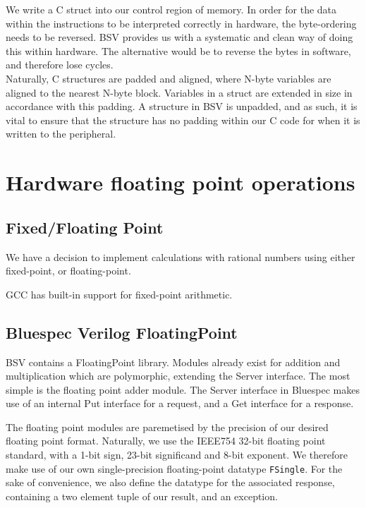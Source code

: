 \documentclass[a4paper,8pt]{report}
\begin{document}
We write a C struct into our control region of memory. In order for the data
within the instructions to be interpreted correctly in hardware, the
byte-ordering needs to be reversed. BSV provides us with a systematic and clean
way of doing this within hardware. The alternative would be to reverse the bytes
in software, and therefore lose cycles. \\


Naturally, C structures are padded and aligned, where N-byte variables are
aligned to the nearest N-byte block. Variables in a struct are extended in size
in accordance with this padding. A structure in BSV is unpadded, and as such, it
is vital to ensure that the structure has no padding within our C code for when
it is written to the peripheral.

\section{Hardware floating point operations}
\subsection{Fixed/Floating Point}
We have a decision to implement calculations with rational numbers using either
fixed-point, or floating-point.


GCC has built-in support for fixed-point arithmetic.

\subsection{Bluespec Verilog FloatingPoint}
BSV contains a FloatingPoint library. Modules already exist for addition and
multiplication which are polymorphic, extending the Server interface. The most
simple is the floating point adder module. The Server interface in Bluespec
makes use of an internal Put interface for a request, and a Get interface for a
response.

The floating point modules are paremetised by the precision of our desired floating
point format. Naturally, we use the IEEE754 32-bit floating point standard, with a 1-bit sign,
23-bit significand and 8-bit exponent. We therefore make use of our own
single-precision floating-point datatype \texttt{FSingle}. For the sake of
convenience, we also define the datatype for the associated response, containing
a two element tuple of our result, and an exception.
\end{document}
